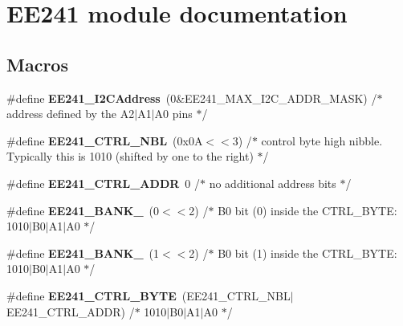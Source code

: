 \hypertarget{group___e_e241__module}{\section{E\-E241 module documentation}
\label{group___e_e241__module}
}
\subsection*{Macros}
\begin{DoxyCompactItemize}
\item 
\hypertarget{group___e_e241__module_gac379aa2a833544e88009bed0e7eefb86}{\#define {\bfseries E\-E241\-\_\-\-I2\-C\-Address}~(0\&E\-E241\-\_\-\-M\-A\-X\-\_\-\-I2\-C\-\_\-\-A\-D\-D\-R\-\_\-\-M\-A\-S\-K) /$\ast$ address defined by the A2$|$A1$|$A0 pins $\ast$/}\label{group___e_e241__module_gac379aa2a833544e88009bed0e7eefb86}

\item 
\hypertarget{group___e_e241__module_gaa30882b7dd52d195d9b682f7af6628ec}{\#define {\bfseries E\-E241\-\_\-\-C\-T\-R\-L\-\_\-\-N\-B\-L}~(0x0\-A$<$$<$3)  /$\ast$ control byte high nibble. Typically this is 1010 (shifted by one to the right) $\ast$/}\label{group___e_e241__module_gaa30882b7dd52d195d9b682f7af6628ec}

\item 
\hypertarget{group___e_e241__module_ga7851878a57a010307c3ff8b85001b8f8}{\#define {\bfseries E\-E241\-\_\-\-C\-T\-R\-L\-\_\-\-A\-D\-D\-R}~0        /$\ast$ no additional address bits $\ast$/}\label{group___e_e241__module_ga7851878a57a010307c3ff8b85001b8f8}

\item 
\hypertarget{group___e_e241__module_ga9226f0b77a422d7ca0ca9e81605904ee}{\#define {\bfseries E\-E241\-\_\-\-B\-A\-N\-K\-\_}~(0$<$$<$2)   /$\ast$ B0 bit (0) inside the C\-T\-R\-L\-\_\-\-B\-Y\-T\-E\-: 1010$|$B0$|$A1$|$A0 $\ast$/}\label{group___e_e241__module_ga9226f0b77a422d7ca0ca9e81605904ee}

\item 
\hypertarget{group___e_e241__module_gaba8ed89063d584c4b368c5314b769d83}{\#define {\bfseries E\-E241\-\_\-\-B\-A\-N\-K\-\_}~(1$<$$<$2)   /$\ast$ B0 bit (1) inside the C\-T\-R\-L\-\_\-\-B\-Y\-T\-E\-: 1010$|$B0$|$A1$|$A0 $\ast$/}\label{group___e_e241__module_gaba8ed89063d584c4b368c5314b769d83}

\item 
\hypertarget{group___e_e241__module_ga8ab0312edca14b07d9d0fbe4e5a22298}{\#define {\bfseries E\-E241\-\_\-\-C\-T\-R\-L\-\_\-\-B\-Y\-T\-E}~(E\-E241\-\_\-\-C\-T\-R\-L\-\_\-\-N\-B\-L$|$E\-E241\-\_\-\-C\-T\-R\-L\-\_\-\-A\-D\-D\-R) /$\ast$ 1010$|$B0$|$A1$|$A0 $\ast$/}\label{group___e_e241__module_ga8ab0312edca14b07d9d0fbe4e5a22298}


\end{DoxyCompactItemize}
